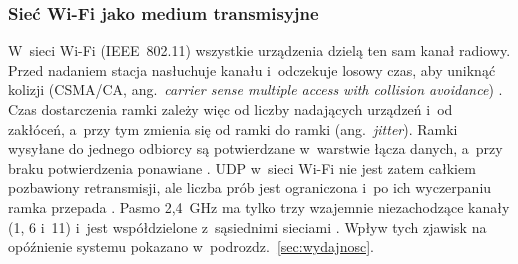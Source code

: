 \subsubsection*{Sieć Wi-Fi jako medium transmisyjne}

W~sieci Wi-Fi (IEEE~802.11) wszystkie urządzenia dzielą ten sam kanał
radiowy. Przed nadaniem stacja nasłuchuje kanału i~odczekuje losowy czas,
aby uniknąć kolizji (CSMA/CA, ang.~\textit{carrier sense multiple access
with collision avoidance}) \cite{kurose_2021}. Czas dostarczenia ramki
zależy więc od liczby nadających urządzeń i~od zakłóceń, a~przy tym
zmienia się od ramki do ramki (ang.~\textit{jitter}). Ramki wysyłane do
jednego odbiorcy są potwierdzane w~warstwie łącza danych, a~przy braku
potwierdzenia ponawiane \cite{kurose_2021}. UDP w~sieci Wi-Fi nie jest
zatem całkiem pozbawiony retransmisji, ale liczba prób jest ograniczona
i~po ich wyczerpaniu ramka przepada \cite{kurose_2021}. Pasmo 2,4~GHz ma
tylko trzy wzajemnie niezachodzące kanały (1, 6 i~11) i~jest
współdzielone z~sąsiednimi sieciami \cite{kurose_2021}. Wpływ tych
zjawisk na opóźnienie systemu pokazano w~podrozdz.~\ref{sec:wydajnosc}.
